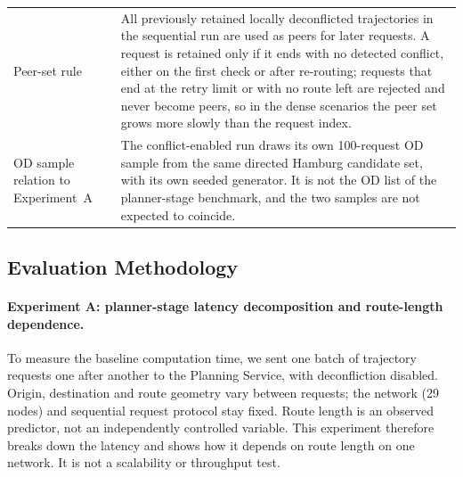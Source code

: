 \begin{table}[H]
\begin{tabularx}{\textwidth}{lX}
        Peer-set rule & All previously retained locally deconflicted trajectories in the sequential run are used as peers for later requests. A request is retained only if it ends with no detected conflict, either on the first check or after re-routing; requests that end at the retry limit or with no route left are rejected and never become peers, so in the dense scenarios the peer set grows more slowly than the request index. \\
        OD sample relation to Experiment~A & The conflict-enabled run draws its own 100-request OD sample from the same directed Hamburg candidate set, with its own seeded generator. It is not the OD list of the planner-stage benchmark, and the two samples are not expected to coincide. \\
        \bottomrule
    \end{tabularx}
\end{table}

\subsection{Evaluation Methodology}
\label{sec:evaluation_methodology}

\paragraph{Experiment A: planner-stage latency decomposition and route-length dependence.}
To measure the baseline computation time, we sent one batch of trajectory requests one after another to the Planning Service, with deconfliction disabled. Origin, destination and route geometry vary between requests; the network (29 nodes) and sequential request protocol stay fixed. Route length is an observed predictor, not an independently controlled variable. This experiment therefore breaks down the latency and shows how it depends on route length on one network. It is not a scalability or throughput test.

